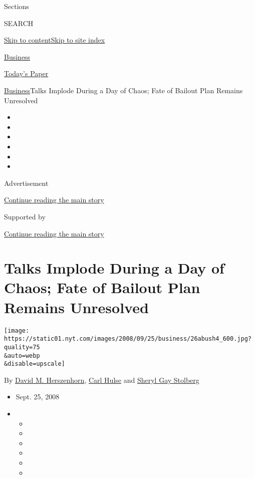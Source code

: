 Sections

SEARCH

\protect\hyperlink{site-content}{Skip to
content}\protect\hyperlink{site-index}{Skip to site index}

\href{https://www.nytimes.com/section/business}{Business}

\href{https://myaccount.nytimes.com/auth/login?response_type=cookie\&client_id=vi}{}

\href{https://www.nytimes.com/section/todayspaper}{Today's Paper}

\href{/section/business}{Business}\textbar{}Talks Implode During a Day
of Chaos; Fate of Bailout Plan Remains Unresolved

\begin{itemize}
\item
\item
\item
\item
\item
\item
\end{itemize}

Advertisement

\protect\hyperlink{after-top}{Continue reading the main story}

Supported by

\protect\hyperlink{after-sponsor}{Continue reading the main story}

\hypertarget{talks-implode-during-a-day-of-chaos-fate-of-bailout-plan-remains-unresolved}{%
\section{Talks Implode During a Day of Chaos; Fate of Bailout Plan
Remains
Unresolved}\label{talks-implode-during-a-day-of-chaos-fate-of-bailout-plan-remains-unresolved}}

\texttt{[image: https://static01.nyt.com/images/2008/09/25/business/26abush4\_600.jpg?quality=75\\\&auto=webp\\\&disable=upscale]}

By \href{https://www.nytimes.com/by/david-m-herszenhorn}{David M.
Herszenhorn}, \href{https://www.nytimes.com/by/carl-hulse}{Carl Hulse}
and \href{https://www.nytimes.com/by/sheryl-gay-stolberg}{Sheryl Gay
Stolberg}

\begin{itemize}
\item
  Sept. 25, 2008
\item
  \begin{itemize}
  \item
  \item
  \item
  \item
  \item
  \item
  \end{itemize}
\end{itemize}

